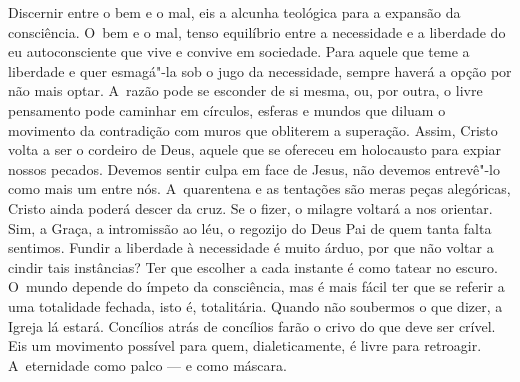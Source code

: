 Discernir entre o bem e o mal, eis a alcunha teológica para a expansão
da consciência. O~bem e o mal, tenso equilíbrio entre a necessidade e a
liberdade do eu autoconsciente que vive e convive em sociedade. Para
aquele que teme a liberdade e quer esmagá"-la sob o jugo da necessidade,
sempre haverá a opção por não mais optar. A~razão pode se esconder de si
mesma, ou, por outra, o livre pensamento pode caminhar em círculos,
esferas e mundos que diluam o movimento da contradição com muros que
obliterem a superação. Assim, Cristo volta a ser o cordeiro de Deus,
aquele que se ofereceu em holocausto para expiar nossos pecados. Devemos
sentir culpa em face de Jesus, não devemos entrevê"-lo como mais um entre
nós. A~quarentena e as tentações são meras peças alegóricas, Cristo
ainda poderá descer da cruz. Se o fizer, o milagre voltará a nos
orientar. Sim, a Graça, a intromissão ao léu, o regozijo do Deus Pai de
quem tanta falta sentimos. Fundir a liberdade à necessidade é muito
árduo, por que não voltar a cindir tais instâncias? Ter que escolher a
cada instante é como tatear no escuro. O~mundo depende do ímpeto da
consciência, mas é mais fácil ter que se referir a uma totalidade
fechada, isto é, totalitária. Quando não soubermos o que dizer, a Igreja
lá estará. Concílios atrás de concílios farão o crivo do que deve ser
crível. Eis um movimento possível para quem, dialeticamente, é livre
para retroagir. A~eternidade como palco --- e como máscara.

